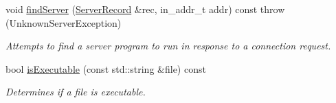 \begin{DoxyCompactItemize}
void \hyperlink{classNERD_1_1ConnectionServer_a9d75b0d048d374095c4d7c96e4add7f8}{find\-Server} (\hyperlink{structNERD_1_1ConnectionServer_1_1ServerRecord}{\-Server\-Record} \&rec, in\-\_\-addr\-\_\-t addr) const   throw (\-Unknown\-Server\-Exception)
\begin{DoxyCompactList}\small\item\em \-Attempts to find a server program to run in response to a connection request. \end{DoxyCompactList}\item 
bool \hyperlink{classNERD_1_1ConnectionServer_a31818d0fbe0366a7b902095445405406}{is\-Executable} (const std\-::string \&file) const 
\begin{DoxyCompactList}\small\item\em \-Determines if a file is executable. \end{DoxyCompactList}\end{DoxyCompactItemize}
